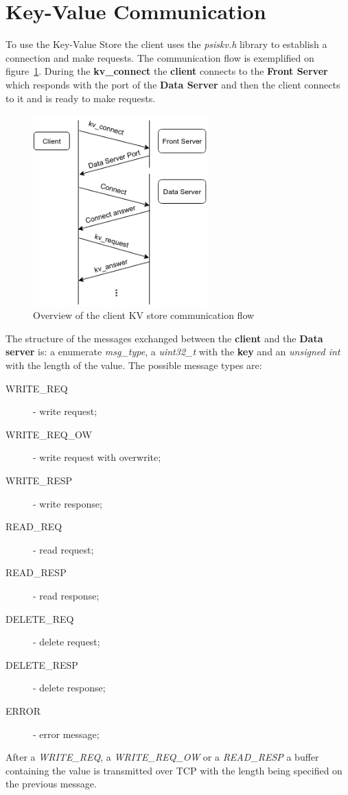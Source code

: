 \documentclass[12pt]{article} %
\begin{document}
\section{Key-Value Communication}

To use the Key-Value Store the client uses the \emph{psiskv.h} library to establish a
connection and make requests. The communication flow is exemplified on figure~\ref{fig:Comms}.
During the \textbf{kv\_connect} the \textbf{client} connects to the \textbf{Front Server} which responds
with the port of the \textbf{Data Server} and then the client connects to it and is ready
to make requests.

\begin{figure}[H]
\centering
\includegraphics[width=0.6\textwidth]{./Pictures/CommunicationFlow.png}
\caption{Overview of the client KV store communication flow}\label{fig:Comms}
\end{figure}

The structure of the messages exchanged between the \textbf{client} and the \textbf{Data server}
is:  a  enumerate \emph{msg\_type}, a \emph{uint32\_t} with the \textbf{key} and an \emph{unsigned int}
with the length of the value. The possible message types are:
\begin{description}
    \item[WRITE\_REQ] - write request;
    \item[WRITE\_REQ\_OW] - write request with overwrite;
    \item[WRITE\_RESP] - write response;
    \item[READ\_REQ] - read request;
    \item[READ\_RESP] - read response;
    \item[DELETE\_REQ] - delete request;
    \item[DELETE\_RESP] - delete response;
    \item[ERROR] - error message;
\end{description}
After a \emph{WRITE\_REQ}, a \emph{WRITE\_REQ\_OW} or a \emph{READ\_RESP} a buffer containing
the value is transmitted over TCP with the length being specified on the previous
message.
\end{document}
